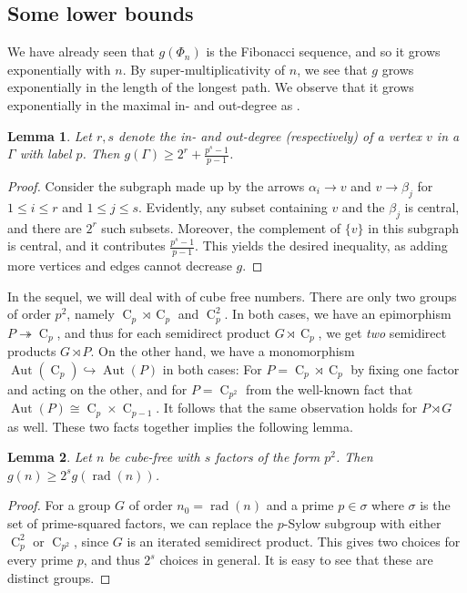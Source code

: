 \documentclass[draft]{article}
\newcommand{\aut}[1]{\operatorname{Aut}(#1)}
\newcommand{\cyc}[1]{\operatorname{C}_{#1}}
\theoremstyle{plain}
\newtheorem{lem}{Lemma}[section]
\theoremstyle{definition}
\begin{document}
\subsection{Some lower bounds}
We have already seen that $g(\Phi_n)$ is the Fibonacci sequence, and so it grows exponentially with $n$. By super-multiplicativity of $n$, we see that $g$ grows exponentially in the length of the longest path. We observe that it grows exponentially in the maximal in- and out-degree as .
\begin{lem}
	Let $r, s$ denote the in- and out-degree (respectively) of a vertex $v$ in a \hg $\Gamma$ with label $p$. Then $g(\Gamma) \ge 2^r + \frac{p^s - 1}{p - 1}$.
\end{lem}
\begin{proof}
	Consider the subgraph made up by the arrows $\alpha_i \rightarrow v$ and $v \rightarrow \beta_j$ for $1 \le i \le r$ and $1 \le j \le s$. Evidently, any subset containing $v$ and the $\beta_j$ is central, and there are $2^r$ such subsets. Moreover, the complement of $\{v\}$ in this subgraph is central, and it contributes $\frac{p^s - 1}{p - 1}$. This yields the desired inequality, as adding more vertices and edges cannot decrease \nolinebreak[4] $g$.
\end{proof}
In the sequel, we will deal with \ghgs of cube free numbers. There are only two groups of order $p^2$, namely $\cyc{p} \rtimes \cyc{p}$ and $\cyc{p}^2$. In both cases, we have an epimorphism $P \twoheadrightarrow \cyc{p}$, and thus for each semidirect product $G \rtimes \cyc{p}$, we get \textit{two} semidirect products $G \rtimes P$. On the other hand, we have a monomorphism $\aut{\cyc{p}} \hookrightarrow \aut{P}$ in both cases: For $P = \cyc{p} \rtimes \cyc{p}$ by fixing one factor and acting on the other, and for $P = \cyc{p^2}$ from the well-known fact that $\aut{P} \cong \cyc{p} \times \cyc{p - 1}$. It follows that the same observation holds for $P \rtimes G$ as well. These two facts together implies the following lemma.
\begin{lem}
	Let $n$ be cube-free with $s$ factors of the form $p^2$. Then $g(n) \ge 2^s g(\operatorname{rad}(n))$.
\end{lem}
\begin{proof}
	For a group $G$ of order $n_0 = \operatorname{rad}(n)$ and a prime $p \in \sigma$ where $\sigma$ is the set of prime-squared factors, we can replace the $p$-Sylow subgroup with either $\cyc{p}^2$ or $\cyc{p^2}$, since $G$ is an iterated semidirect product. This gives two choices for every prime $p$, and thus $2^s$ choices in general. It is easy to see that these are distinct groups.
\end{proof}
\end{document}
